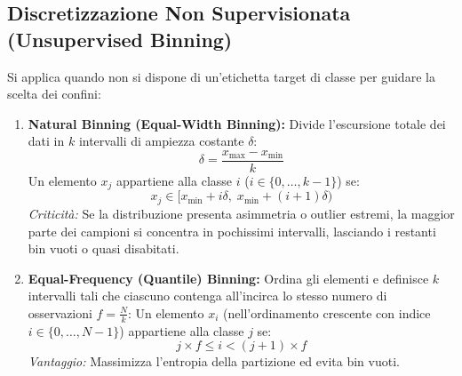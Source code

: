 \subsection{Discretizzazione Non Supervisionata (Unsupervised Binning)}
Si applica quando non si dispone di un'etichetta target di classe per guidare la scelta dei confini:

\begin{enumerate}
    \item \textbf{Natural Binning (Equal-Width Binning):}
    Divide l'escursione totale dei dati in $k$ intervalli di ampiezza costante $\delta$:
    \begin{equation}
    \delta = \frac{x_{\max} - x_{\min}}{k}
    \end{equation}
    Un elemento $x_j$ appartiene alla classe $i$ ($i \in \{0, \dots, k-1\}$) se:
    \begin{equation}
    x_j \in [x_{\min} + i\delta, \; x_{\min} + (i+1)\delta)
    \end{equation}
    \textit{Criticità:} Se la distribuzione presenta asimmetria o outlier estremi, la maggior parte dei campioni si concentra in pochissimi intervalli, lasciando i restanti bin vuoti o quasi disabitati.
    
    \item \textbf{Equal-Frequency (Quantile) Binning:}
    Ordina gli elementi e definisce $k$ intervalli tali che ciascuno contenga all'incirca lo stesso numero di osservazioni $f = \frac{N}{k}$:
    Un elemento $x_i$ (nell'ordinamento crescente con indice $i \in \{0, \dots, N-1\}$) appartiene alla classe $j$ se:
    \begin{equation}
    j \times f \le i < (j+1) \times f
    \end{equation}
    \textit{Vantaggio:} Massimizza l'entropia della partizione ed evita bin vuoti.
\end{enumerate}

